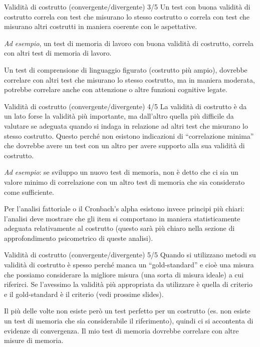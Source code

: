 \documentclass[
  ignorenonframetext,
]{beamer}
\begin{document}
\begin{frame}{Validità di costrutto (convergente/divergente) 3/5}
\label{validituxe0-di-costrutto-convergentedivergente-35}
Un test con buona validità di costrutto correla con test che misurano lo
stesso costrutto o correla con test che misurano altri costrutti in
maniera coerente con le aspettative.

\emph{Ad esempio}, un test di memoria di lavoro con buona validità di
costrutto, correla con altri test di memoria di lavoro.

Un test di comprensione di linguaggio figurato (costrutto più ampio),
dovrebbe correlare con altri test che misurano lo stesso costrutto, ma
in maniera moderata, potrebbe correlare anche con attenzione o altre
funzioni cognitive legate.
\end{frame}

\begin{frame}{Validità di costrutto (convergente/divergente) 4/5}
\label{validituxe0-di-costrutto-convergentedivergente-45}
La validità di costrutto è da un lato forse la validità più importante,
ma dall'altro quella più difficile da valutare se adeguata quando si
indaga in relazione ad altri test che misurano lo stesso costrutto.
Questo perché non esistono indicazioni di ``correlazione minima'' che
dovrebbe avere un test con un altro per avere supporto alla sua validità
di costrutto.

\emph{Ad esempio}: se sviluppo un nuovo test di memoria, non è detto che
ci sia un valore minimo di correlazione con un altro test di memoria che
sia considerato come sufficiente.

Per l'analisi fattoriale o il Cronbach's alpha esistono invece principi
più chiari: l'analisi deve mostrare che gli item si comportano in
maniera statisticamente adeguata relativamente al costrutto (questo sarà
più chiaro nella sezione di approfondimento psicometrico di queste
analisi).
\end{frame}

\begin{frame}{Validità di costrutto (convergente/divergente) 5/5}
\label{validituxe0-di-costrutto-convergentedivergente-55}
Quando si utilizzano metodi su validità di costrutto è spesso perché
manca un ``gold-standard'' e cioè una misura che possiamo considerare la
migliore misura (una sorta di misura ideale) a cui riferirci. Se
l'avessimo la validità più appropriata da utilizzare è quella di
criterio e il gold-standard è il criterio (vedi prossime slides).

Il più delle volte non esiste però un test perfetto per un costrutto
(es. non esiste un test di memoria che sia considerabile il
riferimento), quindi ci si accontenta di evidenze di convergenza. Il mio
test di memoria dovrebbe correlare con altre misure di memoria.
\end{frame}
\end{document}
